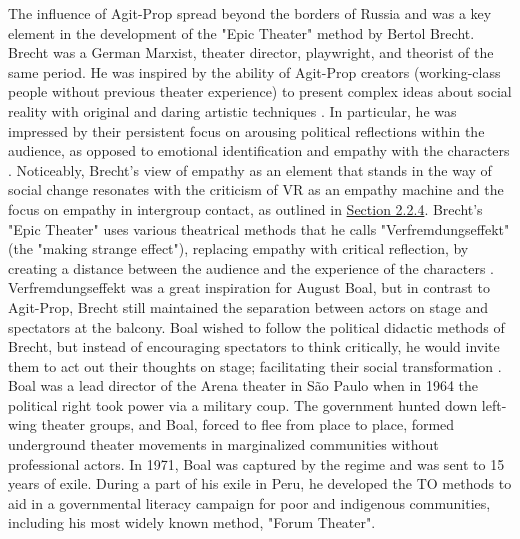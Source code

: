 \documentclass[dissertation,math,vertlayout,pdfa,colorlinks]{aaltoseries}
\begin{document}
The influence of Agit-Prop spread beyond the borders of Russia and was a key element in the development of the "Epic Theater" method by Bertol Brecht. Brecht was a German Marxist, theater director, playwright, and theorist of the same period. He was inspired by the ability of Agit-Prop creators (working-class people without previous theater experience) to present complex ideas about social reality with original and daring artistic techniques \cite{brechtBrechtTheatreTrans1964}. In particular, he was impressed by their persistent focus on arousing political reflections within the audience, as opposed to emotional identification and empathy with the characters \cite{brechtBrechtTheatreTrans1964,friedmanPerformanceActivismPrecursors2021}. Noticeably, Brecht's view of empathy as an element that stands in the way of social change resonates with the criticism of VR as an empathy machine and the focus on empathy in intergroup contact, as outlined in \hyperref[sec:vr_empathy]{Section 2.2.4}. Brecht's "Epic Theater" uses various theatrical methods that he calls "Verfremdungseffekt" (the "making strange effect"), replacing empathy with critical reflection, by creating a distance between the audience and the experience of the characters \cite{brechtBrechtTheatreTrans1964}. Verfremdungseffekt was a great inspiration for August Boal, but in contrast to Agit-Prop, Brecht still maintained the separation between actors on stage and spectators at the balcony. Boal wished to follow the political didactic methods of Brecht, but instead of encouraging spectators to think critically, he would invite them to act out their thoughts on stage; facilitating their social transformation \cite{boalTheatreOppressed2008}. Boal was a lead director of the Arena theater in São Paulo when in 1964 the political right took power via a military coup. The government hunted down left-wing theater groups, and Boal, forced to flee from place to place, formed underground theater movements in marginalized communities without professional actors. In 1971, Boal was captured by the regime and was sent to 15 years of exile. During a part of his exile in Peru, he developed the TO methods to aid in a governmental literacy campaign for poor and indigenous communities, including his most widely known method, "Forum Theater".
\end{document}
